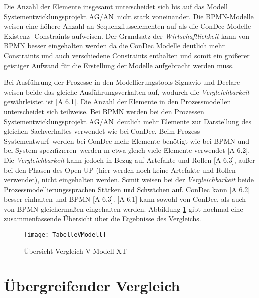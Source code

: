 {Die Anzahl der Elemente insgesamt unterscheidet sich bis auf das Modell \grqq Systementwicklungsprojekt AG/AN\grqq \ nicht stark voneinander. Die BPMN-Modelle weisen eine höhere Anzahl an Sequenzflusselementen auf als die ConDec Modelle Existenz- Constraints aufweisen.
Der Grundsatz der \textit{Wirtschaftlichkeit} kann von BPMN besser eingehalten werden da die ConDec Modelle deutlich mehr Constraints und auch verschiedene Constraints enthalten und somit ein größerer geistiger Aufwand für die Erstellung der Modelle aufgebracht werden muss.\newline


Bei Ausführung der Prozesse in den Modellierungstools Signavio und Declare weisen beide das gleiche Ausführungsverhalten auf, wodurch die \textit{Vergleichbarkeit} gewährleistet ist [A 6.1]. \newline
Die Anzahl der Elemente in den Prozessmodellen unterscheidet sich teilweise. Bei BPMN werden bei den Prozessen \grqq Systementwicklungsprojekt AG/AN\grqq \ deutlich mehr Elemente zur Darstellung des gleichen Sachverhaltes verwendet wie bei ConDec. Beim Prozess \grqq Systementwurf\grqq \ werden bei ConDec mehr Elemente benötigt wie bei BPMN und bei \grqq System spezifizieren\grqq \ werden in etwa gleich viele Elemente verwendet [A 6.2].\newline
Die \textit{Vergleichbarkeit} kann jedoch in Bezug auf Artefakte und Rollen [A 6.3], außer bei den Phasen des Open UP (hier werden noch keine Artefakte und Rollen verwendet), nicht eingehalten werden.\newline
Somit weisen bei der \textit{Vergleichbarkeit} beide Prozessmodellierungssprachen Stärken und Schwächen auf. ConDec kann [A 6.2] besser einhalten und BPMN [A 6.3]. [A 6.1] kann sowohl von ConDec, als auch von BPMN gleichermaßen eingehalten werden. \newline
Abbildung \ref{fig:TabelleVModell} gibt nochmal eine zusammenfassende Übersicht über die Ergebnisse des Vergleichs. 


\begin{figure}[!htbp]
\begin{center}
  \texttt{[image: TabelleVModell]} %
  \caption{Übersicht Vergleich V-Modell XT}
  \label{fig:TabelleVModell}
\end{center}
\end{figure}


\section{Übergreifender Vergleich}

}
